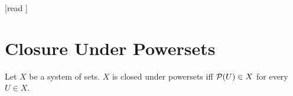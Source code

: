 \documentclass[10pt]{article}
\begin{document}
  \begin{imports}
    \begin{forthel}
      [read ]
    \end{forthel}
  \end{imports}


  \section*{Closure Under Powersets}

  \begin{forthel}
    \begin{definition}[id=FOUNDATIONS_14_4652013578120594,printid]
      Let $X$ be a system of sets.
      $X$ is closed under powersets iff $\mathcal{P}(U) \in X$ for every $U \in X$.
    \end{definition}
  \end{forthel}
\end{document}
